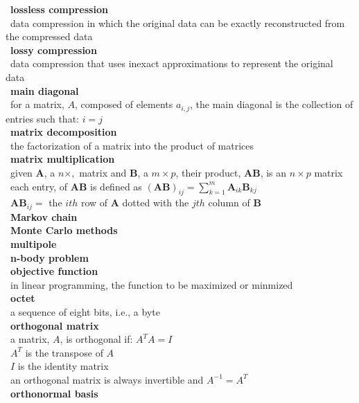 \documentclass[10pt,letterpaper]{scrartcl}
\newcommand{\tbul}{\textbullet}
\newcommand{\tend}{\>\textendash}
\newcommand{\tasc}{\>\>\textasteriskcentered}
\begin{document}
\begin{tabbing}
\begin{tabbing}
\tbul\ \textbf{lossless compression} \\ 
    \tend\ data compression in which the original data can be exactly reconstructed from the compressed data \\
\tbul\ \textbf{lossy compression} \\ 
    \tend\ data compression that uses inexact approximations to represent the original data \\
\tbul\ \textbf{main diagonal} \\
    \tend\ for a matrix, $A$, composed of elements $a_{i,j}$, the main diagonal is the collection of entries such that: $i=j$ \\
\tbul\ \textbf{matrix decomposition} \\
    \tend\ the factorization of a matrix into the product of matrices \\
\tbul\ \textbf{matrix multiplication} \\
    \tend\ given $\mathbf{A}$, a $n\times ,$ matrix and $\mathbf{B}$, a $m\times p$, their product, $\mathbf{AB}$, is an $n\times p$ matrix\\
    \tend\ each entry, of $\mathbf{AB}$ is defined as $\displaystyle (\mathbf{AB})_{ij} = \sum_{k=1}^{m}\mathbf{A}_{ik}\mathbf{B}_{kj}$ \\
    \tend\ $\mathbf{AB}_{ij}=$ the $ith$ row of $\mathbf{A}$ dotted with the $jth$ column of $\mathbf{B}$ \\
\tbul\ \textbf{Markov chain} \\
\tbul\ \textbf{Monte Carlo methods} \\
\tbul\ \textbf{multipole} \\
\tbul\ \textbf{n-body problem} \\
\tbul\ \textbf{objective function} \\
    \tend\ in linear programming, the function to be maximized or minmized \\
\tbul\ \textbf{octet} \\ 
    \tend\ a sequence of eight bits, i.e., a byte \\
\tbul\ \textbf{orthogonal matrix} \\
    \tend\ a matrix, $A$, is orthogonal if: $A^TA=I$ \\
        \tasc\ $A^T$ is the transpose of $A$ \\
        \tasc\ $I$ is the identity matrix \\
    \tend\ an orthogonal matrix is always invertible and $A^{-1} = A^T$ \\
\tbul\ \textbf{orthonormal basis} \\

\end{tabbing}
\end{tabbing}
\end{document}
